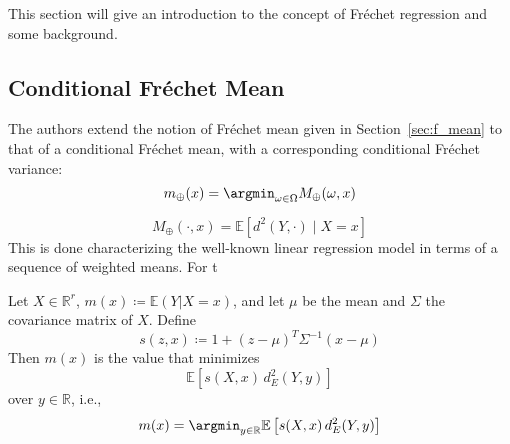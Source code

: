 This section will give an introduction to the concept of Fréchet regression
and some background.

\subsection{Conditional Fréchet Mean}
\label{sec:cond_fmean}
The authors extend the notion of Fréchet mean given in Section~\ref{sec:f_mean} to that
of a conditional Fréchet mean, with a corresponding conditional Fréchet variance:
\begin{equation}
    m_\oplus(x) = \argmin_{\omega \in \Omega} M_\oplus(\omega, x)
\end{equation}

\begin{equation}
    M_\oplus(\cdot, x) = \mathbb{E} \left[ d^2(Y, \cdot) \mid X = x \right]
\end{equation}
This is done characterizing the well-known linear regression model in terms of a sequence
of weighted means. For t
\begin{lemma}
    \label{lemma:sequence_weights}
    Let \( X \in \mathbb{R}^r \), \( m(x) \coloneqq \mathbb{E}(Y | X = x) \), and let \( \mu \) 
    be the mean and \( \Sigma \) the covariance matrix of \( X \). Define
    \[
        s(z, x) \coloneqq 1 + (z - \mu)^T \Sigma^{-1} (x - \mu)
    \]
    Then \( m(x) \) is the value that minimizes 
    \[
        \mathbb{E} \left[ s(X, x) \, d_E^2(Y, y)   \right]
    \]
    over \( y \in \mathbb{R} \), i.e.,
    \begin{equation}
        m(x) = \argmin_{y \in \mathbb{R}} \mathbb{E} \left[ s(X, x) \, d_E^2(Y, y) \right]
    \end{equation}
\end{lemma}
